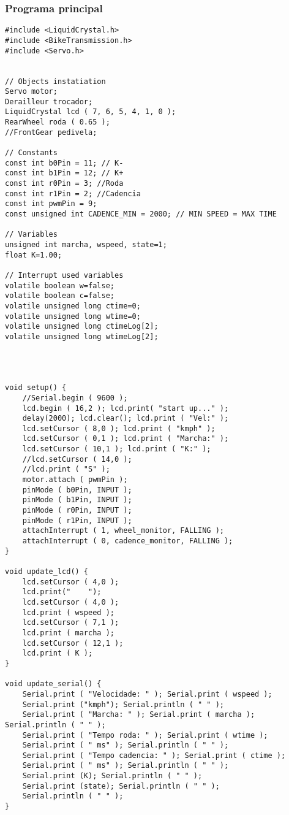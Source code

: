 \documentclass[a4paper,11pt]{article}
\begin{document}
\subsubsection{Programa principal}
\label{code: main}
\begin{lstlisting}
#include <LiquidCrystal.h>
#include <BikeTransmission.h>
#include <Servo.h>


// Objects instatiation
Servo motor;
Derailleur trocador;
LiquidCrystal lcd ( 7, 6, 5, 4, 1, 0 );
RearWheel roda ( 0.65 );
//FrontGear pedivela;

// Constants
const int b0Pin = 11; // K-
const int b1Pin = 12; // K+
const int r0Pin = 3; //Roda
const int r1Pin = 2; //Cadencia
const int pwmPin = 9;
const unsigned int CADENCE_MIN = 2000; // MIN SPEED = MAX TIME

// Variables
unsigned int marcha, wspeed, state=1;
float K=1.00;

// Interrupt used variables
volatile boolean w=false;
volatile boolean c=false;
volatile unsigned long ctime=0;
volatile unsigned long wtime=0;
volatile unsigned long ctimeLog[2];
volatile unsigned long wtimeLog[2];




void setup() {
    //Serial.begin ( 9600 );
    lcd.begin ( 16,2 ); lcd.print( "start up..." );
    delay(2000); lcd.clear(); lcd.print ( "Vel:" );
    lcd.setCursor ( 8,0 ); lcd.print ( "kmph" );
    lcd.setCursor ( 0,1 ); lcd.print ( "Marcha:" );
    lcd.setCursor ( 10,1 ); lcd.print ( "K:" );
    //lcd.setCursor ( 14,0 );
    //lcd.print ( "S" );
    motor.attach ( pwmPin );
    pinMode ( b0Pin, INPUT );
    pinMode ( b1Pin, INPUT );
    pinMode ( r0Pin, INPUT );
    pinMode ( r1Pin, INPUT );
    attachInterrupt ( 1, wheel_monitor, FALLING );
    attachInterrupt ( 0, cadence_monitor, FALLING );
}

void update_lcd() {
    lcd.setCursor ( 4,0 );
    lcd.print("    ");
    lcd.setCursor ( 4,0 );
    lcd.print ( wspeed );
    lcd.setCursor ( 7,1 );
    lcd.print ( marcha );
    lcd.setCursor ( 12,1 );
    lcd.print ( K );
}

void update_serial() {
    Serial.print ( "Velocidade: " ); Serial.print ( wspeed );
    Serial.print ("kmph"); Serial.println ( " " );
    Serial.print ( "Marcha: " ); Serial.print ( marcha ); Serial.println ( " " );
    Serial.print ( "Tempo roda: " ); Serial.print ( wtime );
    Serial.print ( " ms" ); Serial.println ( " " );
    Serial.print ( "Tempo cadencia: " ); Serial.print ( ctime );
    Serial.print ( " ms" ); Serial.println ( " " );
    Serial.print (K); Serial.println ( " " );
    Serial.print (state); Serial.println ( " " );
    Serial.println ( " " );
}


\end{lstlisting}
\end{document}
